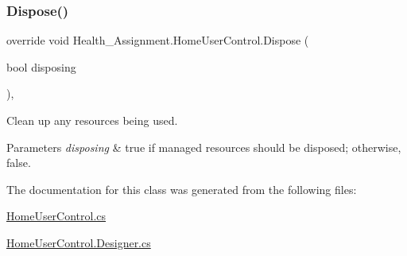 \subsubsection{\texorpdfstring{Dispose()}{Dispose()}}
{\footnotesize\ttfamily override void Health\+\_\+\+Assignment.\+Home\+User\+Control.\+Dispose (\begin{DoxyParamCaption}\item[{bool}]{disposing }\end{DoxyParamCaption})\hspace{0.3cm}{\ttfamily [inline]}, {\ttfamily [protected]}}



Clean up any resources being used. 


\begin{DoxyParams}{Parameters}
{\em disposing} & true if managed resources should be disposed; otherwise, false.\\
\hline
\end{DoxyParams}


The documentation for this class was generated from the following files\+:\begin{DoxyCompactItemize}
\item 
\hyperlink{_home_user_control_8cs}{Home\+User\+Control.\+cs}\item 
\hyperlink{_home_user_control_8_designer_8cs}{Home\+User\+Control.\+Designer.\+cs}\end{DoxyCompactItemize}
